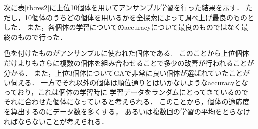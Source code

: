 \documentclass[twocolumn]{jarticle}     %
\begin{document}
次に表\ref{tb:res2}に上位10個体を用いてアンサンブル学習を行った結果を示す．
ただし，10個体のうちどの個体を用いるかを全探索によって調べ上げ最良のものとした．
また，各個体の学習についてのaccuracyについて最良のものではなく最終のもので行った．
\begin{table}[h]
	\centering
	\caption{実験結果\label{tb:res2}}
\end{table}
色を付けたものがアンサンブルに使われた個体である．
このことから上位個体だけよりもさらに複数の個体を組み合わせることで多少の改善が行われることが分かる．
また，上位3個体についてGAで非常に良い個体が選ばれていたことがい伺える．
一方でそれ以外の個体は順位通りとはいかないようなaccuracyとなっており，これは個体の学習時に
学習データをランダムにとってきているのでそれに合わせた個体になっていると考えられる．
このことから，個体の適応度を算出するのにデータ数を多くする，
あるいは複数回の学習の平均をとらなければならないことが考えられる．\\ \\ 
\end{document}
